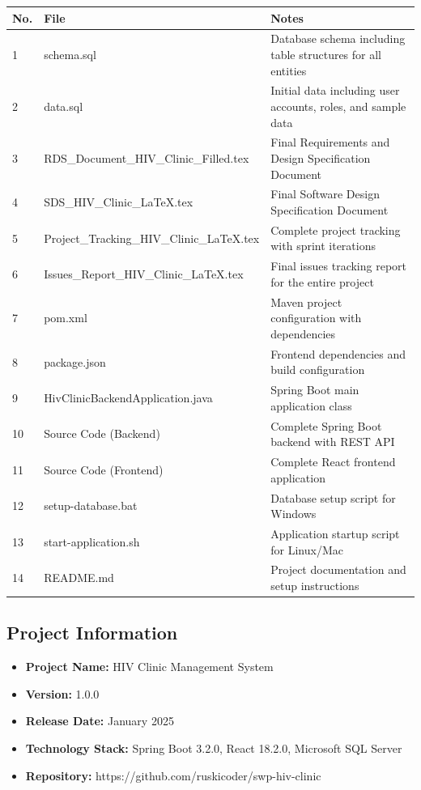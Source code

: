 \documentclass[12pt,a4paper]{article}
\begin{document}
\begin{longtable}{|p{1cm}|p{6cm}|p{7cm}|}
\hline
\textbf{No.} & \textbf{File} & \textbf{Notes} \\
\hline
1 & schema.sql & Database schema including table structures for all entities \\
\hline
2 & data.sql & Initial data including user accounts, roles, and sample data \\
\hline
3 & RDS\_Document\_HIV\_Clinic\_Filled.tex & Final Requirements and Design Specification Document \\
\hline
4 & SDS\_HIV\_Clinic\_LaTeX.tex & Final Software Design Specification Document \\
\hline
5 & Project\_Tracking\_HIV\_Clinic\_LaTeX.tex & Complete project tracking with sprint iterations \\
\hline
6 & Issues\_Report\_HIV\_Clinic\_LaTeX.tex & Final issues tracking report for the entire project \\
\hline
7 & pom.xml & Maven project configuration with dependencies \\
\hline
8 & package.json & Frontend dependencies and build configuration \\
\hline
9 & HivClinicBackendApplication.java & Spring Boot main application class \\
\hline
10 & Source Code (Backend) & Complete Spring Boot backend with REST API \\
\hline
11 & Source Code (Frontend) & Complete React frontend application \\
\hline
12 & setup-database.bat & Database setup script for Windows \\
\hline
13 & start-application.sh & Application startup script for Linux/Mac \\
\hline
14 & README.md & Project documentation and setup instructions \\
\hline
\end{longtable}

\subsection{Project Information}

\begin{itemize}
    \item \textbf{Project Name:} HIV Clinic Management System
    \item \textbf{Version:} 1.0.0
    \item \textbf{Release Date:} January 2025
    \item \textbf{Technology Stack:} Spring Boot 3.2.0, React 18.2.0, Microsoft SQL Server
    \item \textbf{Repository:} https://github.com/ruskicoder/swp-hiv-clinic
\end{itemize}
\end{document}
